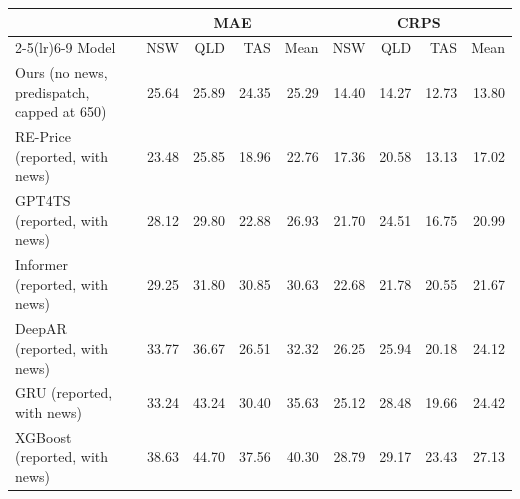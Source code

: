 \begin{tabular}{lrrrrrrrr}
\toprule
& \multicolumn{4}{c}{MAE} & \multicolumn{4}{c}{CRPS} \\
\cmidrule(lr){2-5}\cmidrule(lr){6-9}
Model & NSW & QLD & TAS & Mean & NSW & QLD & TAS & Mean \\
\midrule
Ours (no news, predispatch, capped at 650) & 25.64 & 25.89 & 24.35 & 25.29 & 14.40 & 14.27 & 12.73 & 13.80 \\
\midrule
RE-Price (reported, with news) & 23.48 & 25.85 & 18.96 & 22.76 & 17.36 & 20.58 & 13.13 & 17.02 \\
GPT4TS (reported, with news) & 28.12 & 29.80 & 22.88 & 26.93 & 21.70 & 24.51 & 16.75 & 20.99 \\
Informer (reported, with news) & 29.25 & 31.80 & 30.85 & 30.63 & 22.68 & 21.78 & 20.55 & 21.67 \\
DeepAR (reported, with news) & 33.77 & 36.67 & 26.51 & 32.32 & 26.25 & 25.94 & 20.18 & 24.12 \\
GRU (reported, with news) & 33.24 & 43.24 & 30.40 & 35.63 & 25.12 & 28.48 & 19.66 & 24.42 \\
XGBoost (reported, with news) & 38.63 & 44.70 & 37.56 & 40.30 & 28.79 & 29.17 & 23.43 & 27.13 \\
\bottomrule
\end{tabular}
